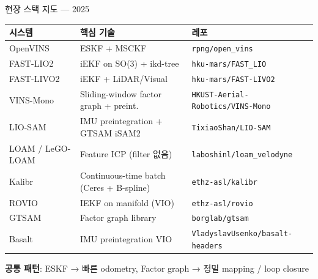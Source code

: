 \begin{frame}{현장 스택 지도 — 2025}
  \begin{center}\footnotesize
  \begin{tabular}{lll}
    \toprule
    시스템 & 핵심 기술 & 레포 \\
    \midrule
    OpenVINS & ESKF + MSCKF & \texttt{rpng/open\_vins} \\
    FAST-LIO2 & iEKF on SO(3) + ikd-tree & \texttt{hku-mars/FAST\_LIO} \\
    FAST-LIVO2 & iEKF + LiDAR/Visual & \texttt{hku-mars/FAST-LIVO2} \\
    VINS-Mono & Sliding-window factor graph + preint. & \texttt{HKUST-Aerial-Robotics/VINS-Mono} \\
    LIO-SAM & IMU preintegration + GTSAM iSAM2 & \texttt{TixiaoShan/LIO-SAM} \\
    LOAM / LeGO-LOAM & Feature ICP (filter 없음) & \texttt{laboshinl/loam\_velodyne} \\
    Kalibr & Continuous-time batch (Ceres + B-spline) & \texttt{ethz-asl/kalibr} \\
    ROVIO & IEKF on manifold (VIO) & \texttt{ethz-asl/rovio} \\
    GTSAM & Factor graph library & \texttt{borglab/gtsam} \\
    Basalt & IMU preintegration VIO & \texttt{VladyslavUsenko/basalt-headers} \\
    \bottomrule
  \end{tabular}
  \end{center}
  \pause
  \vspace{0.2em}
  \textbf{공통 패턴}: ESKF → 빠른 odometry, Factor graph → 정밀 mapping / loop closure
\end{frame}

